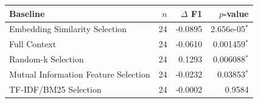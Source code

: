 \begin{tabular}{lrrr}
\toprule
Baseline & $n$ & $\Delta$ F1 & $p$-value \\
\midrule
Embedding Similarity Selection & 24 & -0.0895 & 2.656e-05$^*$ \\
Full Context & 24 & -0.0610 & 0.001459$^*$ \\
Random-k Selection & 24 & 0.1293 & 0.006088$^*$ \\
Mutual Information Feature Selection & 24 & -0.0232 & 0.03853$^*$ \\
TF-IDF/BM25 Selection & 24 & -0.0002 & 0.9584 \\
\bottomrule
\end{tabular}
